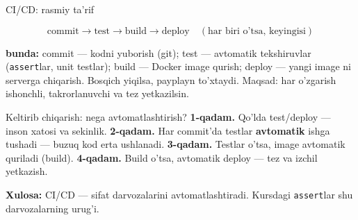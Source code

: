 \documentclass[aspectratio=169,11pt]{beamer}
\newcommand{\bunda}[1]{{\small\textbf{bunda:}\; #1}}
\begin{document}
\begin{frame}{CI/CD: rasmiy ta'rif}
  \begin{tcolorbox}[defbox,title={Ta'rif: avtomatik payplayn}]
    \vspace{-0.4em}
    $$ \text{commit} \rightarrow \text{test} \rightarrow \text{build}
       \rightarrow \text{deploy} \quad (\text{har biri o'tsa, keyingisi}) $$
  \end{tcolorbox}
  \vspace{2pt}
  \bunda{commit --- kodni yuborish (git); test --- avtomatik tekshiruvlar
  (\texttt{assert}lar, unit testlar); build --- Docker image qurish; deploy ---
  yangi image ni serverga chiqarish. Bosqich yiqilsa, payplayn to'xtaydi.}
  \vspace{4pt}
  \footnotesize Maqsad: har o'zgarish ishonchli, takrorlanuvchi va tez yetkazilsin.
\end{frame}

\begin{frame}{Keltirib chiqarish: nega avtomatlashtirish?}
  \textbf{1-qadam.} Qo'lda test/deploy --- inson xatosi va sekinlik.
  \pause
  \textbf{2-qadam.} Har commit'da testlar \textbf{avtomatik} ishga tushadi ---
  buzuq kod erta ushlanadi.
  \pause
  \textbf{3-qadam.} Testlar o'tsa, image avtomatik quriladi (build).
  \pause
  \textbf{4-qadam.} Build o'tsa, avtomatik deploy --- tez va izchil yetkazish.
  \begin{tcolorbox}[okbox,top=2pt,bottom=2pt]
    \small \textbf{Xulosa:} CI/CD --- sifat darvozalarini avtomatlashtiradi.
    Kursdagi \texttt{assert}lar shu darvozalarning urug'i.
  \end{tcolorbox}
\end{frame}
\end{document}
